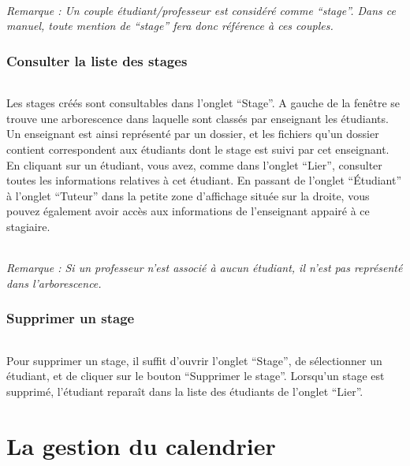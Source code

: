 \documentclass[a4paper,10pt]{report}
\begin{document}
	\paragraph{}
	  \textit{Remarque : Un couple étudiant/professeur est considéré comme ``stage''. Dans ce manuel, toute mention de ``stage'' fera donc référence à ces couples.}
	  
    \section{Consulter la liste des stages}
      \paragraph{}
	Les stages créés sont consultables dans l'onglet ``Stage''.
	A gauche de la fenêtre se trouve une arborescence dans laquelle sont classés par enseignant les étudiants. 
	Un enseignant est ainsi représenté par un dossier, et les fichiers qu'un dossier contient correspondent aux étudiants dont le stage est suivi par cet enseignant.
	En cliquant sur un étudiant, vous avez, comme dans l'onglet ``Lier'', consulter toutes les informations relatives à cet étudiant. 
	En passant de l'onglet ``Étudiant'' à l'onglet ``Tuteur'' dans la petite zone d'affichage située sur la droite, vous pouvez également avoir accès aux informations de l'enseignant appairé à ce stagiaire.
	
	\paragraph{}
	  \textit{Remarque : Si un professeur n'est associé à aucun étudiant, il n'est pas représenté dans l'arborescence.}
      
    \section{Supprimer un stage}
      \paragraph{}
	Pour supprimer un stage, il suffit d'ouvrir l'onglet ``Stage'', de sélectionner un étudiant, et de cliquer sur le bouton ``Supprimer le stage''.
	Lorsqu'un stage est supprimé, l'étudiant reparaît dans la liste des étudiants de l'onglet ``Lier''.
    
    
\part{La gestion du calendrier}
  \setcounter{section}{0}
\end{document}
